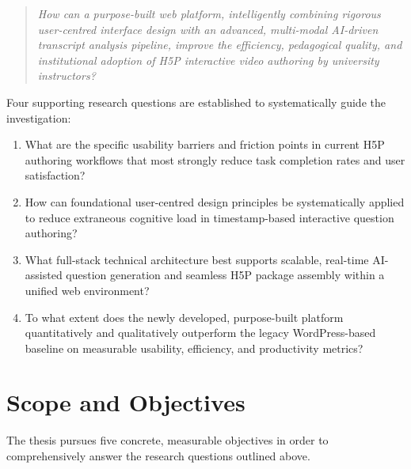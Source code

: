 \begin{quote}
  \itshape How can a purpose-built web platform, intelligently combining rigorous user-centred interface design with an advanced, multi-modal AI-driven transcript analysis pipeline, improve the efficiency, pedagogical quality, and institutional adoption of H5P interactive video authoring by university instructors?
\end{quote}

Four supporting research questions are established to systematically guide the investigation:

\begin{enumerate}[label=RQ\arabic*.]
  \item What are the specific usability barriers and friction points in current H5P authoring workflows that most strongly reduce task completion rates and user satisfaction?
  \item How can foundational user-centred design principles be systematically applied to reduce extraneous cognitive load in timestamp-based interactive question authoring?
  \item What full-stack technical architecture best supports scalable, real-time AI-assisted question generation and seamless H5P package assembly within a unified web environment?
  \item To what extent does the newly developed, purpose-built platform quantitatively and qualitatively outperform the legacy WordPress-based baseline on measurable usability, efficiency, and productivity metrics?
\end{enumerate}

\section{Scope and Objectives}

The thesis pursues five concrete, measurable objectives in order to comprehensively answer the research questions outlined above.

